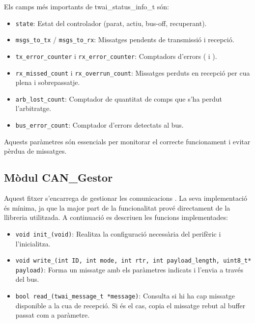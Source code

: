 \documentclass{tfgitic}[2024/07/01]
\begin{document}
Els camps més importants de twai\_status\_info\_t són:

\begin{itemize}
    \item \texttt{state}: Estat del controlador (parat, actiu, bus-off, recuperant).
    \item \texttt{msgs\_to\_tx} / \texttt{msgs\_to\_rx}: Missatges pendents de transmissió i recepció.
    \item \texttt{tx\_error\_counter} i \texttt{rx\_error\_counter}: Comptadors d'errors ( i ).
    \item \texttt{rx\_missed\_count} i \texttt{rx\_overrun\_count}: Missatges perduts en recepció per cua plena i sobrepassatje.
    \item \texttt{arb\_lost\_count}: Comptador de quantitat de comps que s'ha perdut l'arbitratge.
    \item \texttt{bus\_error\_count}: Comptador d'errors detectats al bus.
\end{itemize}

Aquests paràmetres són essencials per monitorar el correcte funcionament i evitar pèrdua de missatges.

\subsection{Mòdul CAN\_Gestor}

Aquest fitxer s'encarrega de gestionar les comunicacions . La seva implementació és mínima, ja que la major part de la funcionalitat prové 
directament de la llibreria utilitzada. A continuació es descriuen les funcions implementades:

\begin{itemize}
  \item \texttt{void init\_(void)}: Realitza la configuració necessària del perifèric  i l'inicialitza.

  \item \texttt{void write\_(int ID, int mode, int rtr, int payload\_length, uint8\_t* payload)}: Forma un missatge  amb els paràmetres indicats i 
  l'envia a través del bus.

  \item \texttt{bool read\_(twai\_message\_t *message)}: Consulta si hi ha cap missatge disponible a la cua de recepció. Si és el cas, copia el missatge 
  rebut al buffer passat com a paràmetre.
\end{itemize}
\end{document}
